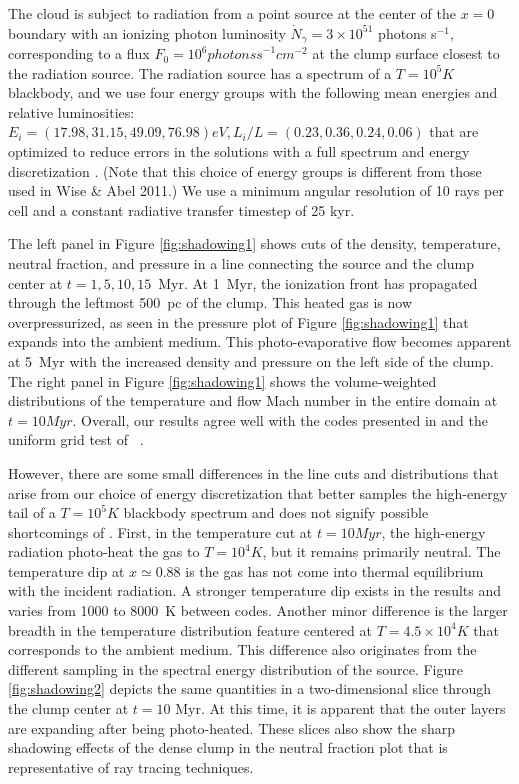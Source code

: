 The cloud is subject to radiation from a point source at the center of
the $x=0$ boundary with an ionizing photon luminosity $\dot{N}_\gamma
= 3 \times 10^{51}$ photons s$^{-1}$, corresponding to a flux $F_0 =
10^6 \unit{photons s}^{-1} \unit{cm}^{-2}$ at the clump surface
closest to the radiation source.  The radiation source has a spectrum
of a $T = 10^5 \unit{K}$ blackbody, and we use four energy groups with
the following mean energies and relative luminosities: $E_i = (17.98,
31.15, 49.09, 76.98) \unit{eV}, L_i/L = (0.23, 0.36, 0.24, 0.06)$ that
are optimized to reduce errors in the solutions with a full spectrum
and energy discretization \citep{Mirocha12}.  (Note that this choice
of energy groups is different from those used in Wise \& Abel 2011.)
\nocite{Wise11_Moray} We use a minimum angular resolution of 10 rays
per cell and a constant radiative transfer timestep of 25 kyr.  

The left panel in Figure \ref{fig:shadowing1} shows cuts of the
density, temperature, neutral fraction, and pressure in a line
connecting the source and the clump center at $t = 1, 5, 10, 15$~Myr.
At 1~Myr, the ionization front has propagated through the leftmost
500~pc of the clump.  This heated gas is now overpressurized, as seen
in the pressure plot of Figure \ref{fig:shadowing1} that expands into
the ambient medium.  This photo-evaporative flow becomes apparent at
5~Myr with the increased density and pressure on the left side of the
clump.  The right panel in Figure \ref{fig:shadowing1} shows the
volume-weighted distributions of the temperature and flow Mach number
in the entire domain at $t = 10 \unit{Myr}$.  Overall, our results
agree well with the codes presented in \citet{IlievEtAl2009} and the
uniform grid test of \moray~\citep{Wise11_Moray}.

However, there are some small differences in the line cuts and
distributions that arise from our choice of energy discretization that
better samples the high-energy tail of a $T = 10^5 \unit{K}$ blackbody
spectrum and does not signify possible shortcomings of \moray.  First,
in the temperature cut at $t = 10 \unit{Myr}$, the high-energy
radiation photo-heat the gas to $T = 10^4 \unit{K}$, but it remains
primarily neutral.  The temperature dip at $x \simeq 0.88$ is the gas
has not come into thermal equilibrium with the incident radiation.  A
stronger temperature dip exists in the \citeauthor{IlievEtAl2009}
results and varies from 1000 to 8000~K between codes.  Another minor
difference is the larger breadth in the temperature distribution
feature centered at $T = 4.5 \times 10^4 \unit{K}$ that corresponds to
the ambient medium.  This difference also originates from the
different sampling in the spectral energy distribution of the source.
Figure \ref{fig:shadowing2} depicts the same quantities in a
two-dimensional slice through the clump center at $t = 10$ Myr.  At
this time, it is apparent that the outer layers are expanding after
being photo-heated.  These slices also show the sharp shadowing
effects of the dense clump in the neutral fraction plot that is
representative of ray tracing techniques.
